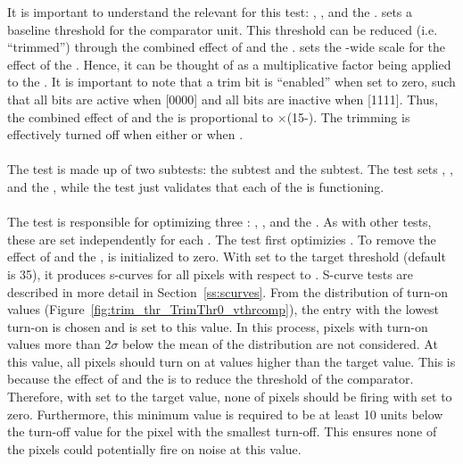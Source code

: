 It is important to understand the relevant \dacs for this test: \vthrcomp, \vtrim, and the \trimbits.
\vthrcomp sets a baseline threshold for the comparator unit.
This threshold can be reduced (i.e. ``trimmed'') through the combined effect of \vtrim and the \trimbits.
\vtrim sets the \roc-wide scale for the effect of the \trimbits.
Hence, it can be thought of as a multiplicative factor being applied to the \trimbits.
It is important to note that a trim bit is ``enabled'' when set to zero, 
such that all bits are active when  [0000] and all bits are inactive when  [1111].
Thus, the combined effect of \vtrim and the \trimbits is proportional to \vtrim$\times$(15-\trimbits).
The trimming is effectively turned off when either  or when .
\\\\
The \trimming test is made up of two subtests: the \trim subtest and the \trimbit subtest. 
The \trim test sets \vthrcomp, \vtrim, and the \trimbits, while the \trimbit test just validates that each of the \trimbits is functioning.
\\\\
The \trim test is responsible for optimizing three \dacs: \vthrcomp, \vtrim, and the \trimbits.
As with other tests, these \dacs are set independently for each \roc.
The \trim test first optimizies \vthrcomp.
To remove the effect of \vtrim and the \trimbits, \vtrim is initialized to zero.
With \vcal set to the target threshold (default is 35), it produces s-curves for all pixels with respect to \vthrcomp.
S-curve tests are described in more detail in Section~\ref{ss:scurves}.
From the distribution of turn-on values (Figure~\ref{fig:trim_thr_TrimThr0_vthrcomp}), 
the entry with the lowest \vthrcomp turn-on is chosen and \vthrcomp is set to this value.
In this process, pixels with turn-on values more than 2$\sigma$ below the mean of the distribution are not considered.
At this \vthrcomp value, all pixels should turn on at \vcal values higher than the target value.
This is because the effect of \vtrim and the \trimbits is to reduce the threshold of the comparator.
Therefore, with \vcal set to the target value, none of pixels should be firing with \vtrim set to zero.
Furthermore, this minimum \vthrcomp value is required to be at least 10 \dac units 
below the \vthrcomp turn-off value for the pixel with the smallest \vthrcomp turn-off.
This ensures none of the pixels could potentially fire on noise at this \vthrcomp value.
\\\\
